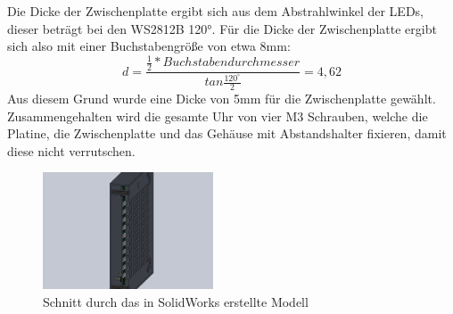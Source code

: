 \documentclass[12pt,journal,compsoc]{IEEEtran}
\begin{document}
Die Dicke der Zwischenplatte ergibt sich aus dem Abstrahlwinkel der LEDs, dieser beträgt bei den WS2812B 120°. Für die Dicke der Zwischenplatte ergibt sich also mit einer Buchstabengröße von etwa 8mm: 
\begin{equation}
d = \frac{\frac{1}{2} * Buchstabendurchmesser}{tan\frac{120^\circ }{2}}= 4,62
\end{equation}
Aus diesem Grund wurde eine Dicke von 5mm für die Zwischenplatte gewählt.
Zusammengehalten wird die gesamte Uhr von vier M3 Schrauben, welche die Platine, die Zwischenplatte und das Gehäuse mit Abstandshalter fixieren, damit diese nicht verrutschen.
\begin{figure}[h]
	\centering
	\includegraphics[width=0.45\textwidth]{Bilder/SW3}
	\caption{Schnitt durch das in SolidWorks erstellte Modell} 
	\label{fig:SW3}
\end{figure}
\end{document}
